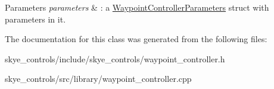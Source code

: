 \begin{DoxyParams}{Parameters}
{\em parameters} & \-: a \hyperlink{struct_waypoint_controller_parameters}{Waypoint\-Controller\-Parameters} struct with parameters in it. \\
\hline
\end{DoxyParams}


The documentation for this class was generated from the following files\-:\begin{DoxyCompactItemize}
\item 
skye\-\_\-controls/include/skye\-\_\-controls/waypoint\-\_\-controller.\-h\item 
skye\-\_\-controls/src/library/waypoint\-\_\-controller.\-cpp\end{DoxyCompactItemize}
